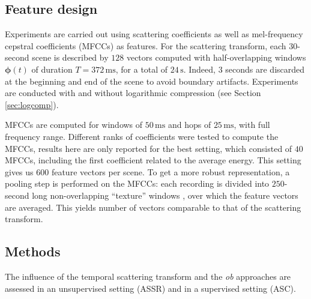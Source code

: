 \documentclass[journal]{IEEEtran}
\newcommand{\ja}[1]{\textcolor{magenta}{Joakim : #1}}
\begin{document}
\subsection{Feature design}

Experiments are carried out using scattering coefficients as well as mel-frequency cepstral coefficients (MFCCs) as features. For the scattering transform, each $30$-second scene is described by $128$ vectors computed with half-overlapping windows $\boldsymbol{\phi}(t)$ of duration $T=372\,\mathrm{ms}$, for a total of $24\,\mathrm{s}$. Indeed, $3$ seconds are discarded at the beginning and end of the scene to avoid boundary artifacts. Experiments are conducted with and without logarithmic compression (see Section \ref{sec:logcomp}).

MFCCs are computed for windows of $50\,\mathrm{ms}$ and hops of $25\,\mathrm{ms}$, with full frequency range. Different ranks of coefficients were tested to compute the MFCCs, results here are only reported for the best setting, which consisted of $40$ MFCCs, including the first coefficient related to the average energy. This setting gives us $600$ feature vectors per scene. To get a more robust representation, a pooling step is performed on the MFCCs: each recording is divided into $250$-second long non-overlapping ``texture'' windows \cite{1021072}, over which the feature vectors are averaged. This yields number of vectors comparable to that of the scattering transform.



\subsection{Methods}

The influence of the temporal scattering transform and the \emph{ob} approaches are assessed in an unsupervised setting (ASSR) and in a supervised setting (ASC).
\end{document}
